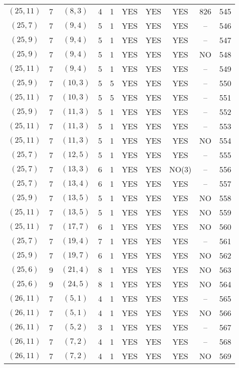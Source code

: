 \begin{longtable}{|c|c|c|c|c|c|c|c|c|c|}
$(25, 11)$ & 7 & $(8, 3)$ & 4 & 1 & YES & YES & YES & 826 & 545\\
$(25, 7)$ & 7 & $(9, 4)$ & 5 & 1 & YES & YES & YES & -- & 546\\
$(25, 9)$ & 7 & $(9, 4)$ & 5 & 1 & YES & YES & YES & -- & 547\\
$(25, 9)$ & 7 & $(9, 4)$ & 5 & 1 & YES & YES & YES & NO & 548\\
$(25, 11)$ & 7 & $(9, 4)$ & 5 & 1 & YES & YES & YES & -- & 549\\
$(25, 9)$ & 7 & $(10, 3)$ & 5 & 5 & YES & YES & YES & -- & 550\\
$(25, 11)$ & 7 & $(10, 3)$ & 5 & 5 & YES & YES & YES & -- & 551\\
$(25, 9)$ & 7 & $(11, 3)$ & 5 & 1 & YES & YES & YES & -- & 552\\
$(25, 11)$ & 7 & $(11, 3)$ & 5 & 1 & YES & YES & YES & -- & 553\\
$(25, 11)$ & 7 & $(11, 3)$ & 5 & 1 & YES & YES & YES & NO & 554\\
$(25, 7)$ & 7 & $(12, 5)$ & 5 & 1 & YES & YES & YES & -- & 555\\
$(25, 7)$ & 7 & $(13, 3)$ & 6 & 1 & YES & YES & NO(3) & -- & 556\\
$(25, 7)$ & 7 & $(13, 4)$ & 6 & 1 & YES & YES & YES & -- & 557\\
$(25, 9)$ & 7 & $(13, 5)$ & 5 & 1 & YES & YES & YES & NO & 558\\
$(25, 11)$ & 7 & $(13, 5)$ & 5 & 1 & YES & YES & YES & NO & 559\\
$(25, 11)$ & 7 & $(17, 7)$ & 6 & 1 & YES & YES & YES & NO & 560\\
$(25, 7)$ & 7 & $(19, 4)$ & 7 & 1 & YES & YES & YES & -- & 561\\
$(25, 9)$ & 7 & $(19, 7)$ & 6 & 1 & YES & YES & YES & NO & 562\\
$(25, 6)$ & 9 & $(21, 4)$ & 8 & 1 & YES & YES & YES & NO & 563\\
$(25, 6)$ & 9 & $(24, 5)$ & 8 & 1 & YES & YES & YES & NO & 564\\
$(26, 11)$ & 7 & $(5, 1)$ & 4 & 1 & YES & YES & YES & -- & 565\\
$(26, 11)$ & 7 & $(5, 1)$ & 4 & 1 & YES & YES & YES & NO & 566\\
$(26, 11)$ & 7 & $(5, 2)$ & 3 & 1 & YES & YES & YES & -- & 567\\
$(26, 11)$ & 7 & $(7, 2)$ & 4 & 1 & YES & YES & YES & -- & 568\\
$(26, 11)$ & 7 & $(7, 2)$ & 4 & 1 & YES & YES & YES & NO & 569\\

\end{longtable}
